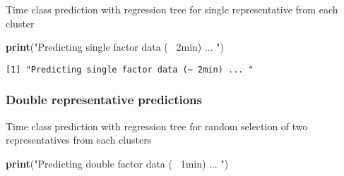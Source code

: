 \documentclass[]{article}
\newenvironment{Shaded}{\begin{snugshade}}{\end{snugshade}}
\newcommand{\KeywordTok}[1]{\textcolor[rgb]{0.13,0.29,0.53}{\textbf{{#1}}}}
\newcommand{\DataTypeTok}[1]{\textcolor[rgb]{0.13,0.29,0.53}{{#1}}}
\newcommand{\DecValTok}[1]{\textcolor[rgb]{0.00,0.00,0.81}{{#1}}}
\newcommand{\StringTok}[1]{\textcolor[rgb]{0.31,0.60,0.02}{{#1}}}
\newcommand{\CommentTok}[1]{\textcolor[rgb]{0.56,0.35,0.01}{\textit{{#1}}}}
\newcommand{\OtherTok}[1]{\textcolor[rgb]{0.56,0.35,0.01}{{#1}}}
\newcommand{\NormalTok}[1]{{#1}}
\begin{document}
Time class prediction with regression tree for single representative
from each cluster

\begin{Shaded}
\begin{Highlighting}[]
\KeywordTok{print}\NormalTok{(}\StringTok{"Predicting single factor data (~ 2min) ... "}\NormalTok{)}
\end{Highlighting}
\end{Shaded}

\begin{verbatim}
[1] "Predicting single factor data (~ 2min) ... "
\end{verbatim}

\begin{Shaded}
\end{Shaded}

\subsubsection{Double representative
predictions}\label{double-representative-predictions}

Time class prediction with regression tree for random selection of two
representatives from each clusters

\begin{Shaded}
\begin{Highlighting}[]
\KeywordTok{print}\NormalTok{(}\StringTok{"Predicting double factor data (~ 1min) ... "}\NormalTok{)}
\end{Highlighting}
\end{Shaded}
\end{document}
